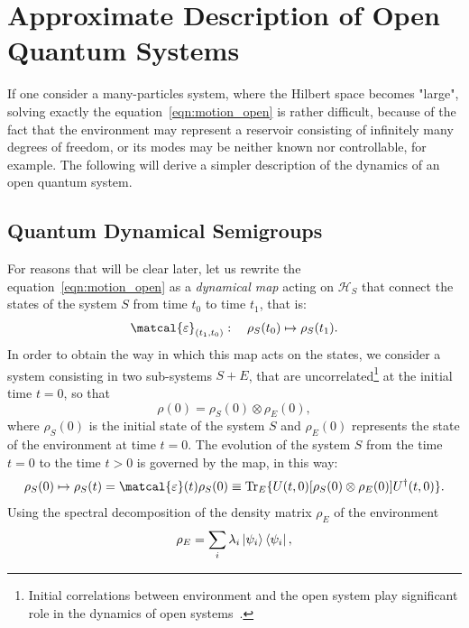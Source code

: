 \section{Approximate Description of Open Quantum Systems}
\label{appr_dynam_oqs}
If one consider a many-particles system, where the Hilbert space becomes "large", solving exactly the equation~\ref{eqn:motion_open} is rather difficult, because of the fact that the environment may represent a reservoir consisting of infinitely many degrees of freedom, or its modes may be neither known nor controllable, for example. The following will derive a simpler description of the dynamics of an open quantum system. 

\subsection{Quantum Dynamical Semigroups}
For reasons that will be clear later, let us rewrite the equation~\ref{eqn:motion_open} as a \emph{dynamical map} acting on $\mathcal{H}_S$ that connect the states of the system $S$ from time $t_0$ to time $t_1$, that is:
\begin{equation}
    \matcal{\varepsilon}_{(t_1, t_0)}: \quad \rho_S(t_0) \mapsto \rho_S(t_1).
\end{equation}
In order to obtain the way in which this map acts on the states, we consider a system consisting in two sub-systems $S+E$, that are uncorrelated\footnote{Initial correlations between environment and the open system play significant role in the dynamics of open systems~\cite{PhysRevA.64.062106}.} at the initial time $t=0$, so that 
\begin{equation}
    \rho(0) = \rho_S(0) \otimes \rho_E(0),
\end{equation}
where $\rho_S(0)$ is the initial state of the system $S$ and $\rho_E(0)$ represents the state of the environment at time $t=0$. The evolution of the system $S$ from the time $t=0$ to the time $t>0$ is governed by the map, in this way:
\begin{equation}
\label{dynam_map}
    \rho_S(0) \mapsto \rho_S(t) = \matcal{\varepsilon}(t)\rho_S(0) \equiv \Tr_E \{U(t, 0)[\rho_S(0) \otimes \rho_E(0)] U^\dagger(t,0)\}.
\end{equation}
Using the spectral decomposition of the density matrix $\rho_E$ of the environment
\begin{equation*}
    \rho_E = \sum_i \lambda_i \ket{\psi_i}\bra{\psi_i},
\end{equation*}
